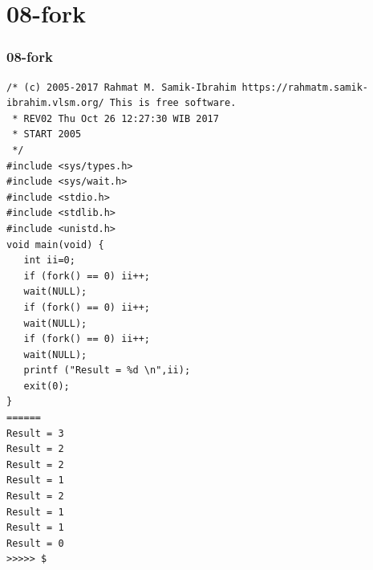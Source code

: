 \documentclass[aspectratio=169, xcolor=table, notheorems, hyperref={pdfpagelabels=false}]{beamer}
\begin{document}
\section{08-fork}
\begin{frame}[fragile]
\frametitle{08-fork}
\begin{lstlisting}[basicstyle=\ttfamily\tiny]
/* (c) 2005-2017 Rahmat M. Samik-Ibrahim https://rahmatm.samik-ibrahim.vlsm.org/ This is free software.
 * REV02 Thu Oct 26 12:27:30 WIB 2017
 * START 2005
 */
#include <sys/types.h>
#include <sys/wait.h>
#include <stdio.h>
#include <stdlib.h>
#include <unistd.h>
void main(void) {
   int ii=0;
   if (fork() == 0) ii++;
   wait(NULL);
   if (fork() == 0) ii++;
   wait(NULL);
   if (fork() == 0) ii++;
   wait(NULL);
   printf ("Result = %d \n",ii);
   exit(0);
}
======
Result = 3 
Result = 2 
Result = 2 
Result = 1 
Result = 2 
Result = 1 
Result = 1 
Result = 0 
>>>>> $ 

\end{lstlisting}
\end{frame}

\end{document}
